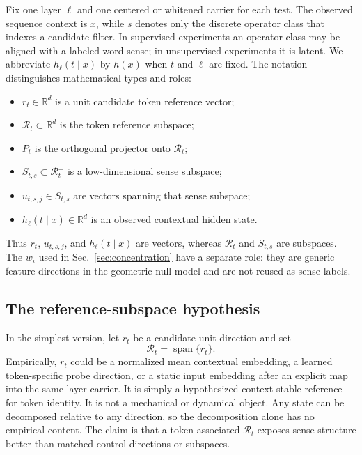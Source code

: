 \documentclass[
  aps,
  reprint,
  superscriptaddress,
  floatfix,
  nofootinbib,
  longbibliography
]{revtex4-2}
\newcommand{\R}{\mathbb{R}}
\DeclareMathOperator{\spanop}{span}
\begin{document}
Fix one layer $\ell$ and one centered or whitened carrier for each test.  The
observed sequence context is $x$, while $s$ denotes only the discrete operator
class that indexes a candidate filter.  In supervised experiments an operator
class may be aligned with a labeled word sense; in unsupervised experiments it
is latent.  We abbreviate $h_\ell(t\mid x)$ by $h(x)$ when $t$ and $\ell$ are
fixed.  The notation distinguishes mathematical types and roles:
%
\begin{itemize}
\item $r_t\in\R^d$ is a unit candidate token reference vector;
\item $\mathcal R_t\subset\R^d$ is the token reference subspace;
\item $P_t$ is the orthogonal projector onto $\mathcal R_t$;
\item $S_{t,s}\subset\mathcal R_t^\perp$ is a low-dimensional sense
subspace;
\item $u_{t,s,j}\in S_{t,s}$ are vectors spanning that sense subspace;
\item $h_\ell(t\mid x)\in\R^d$ is an observed contextual hidden state.
\end{itemize}
%
Thus $r_t$, $u_{t,s,j}$, and $h_\ell(t\mid x)$ are vectors, whereas
$\mathcal R_t$ and $S_{t,s}$ are subspaces. The $w_i$ used in
Sec.~\ref{sec:concentration} have a separate role: they are generic feature
directions in the geometric null model and are not reused as sense labels.

\subsection{The reference-subspace hypothesis}
\label{sec:reference-hypothesis}

In the simplest version, let $r_t$ be a candidate unit direction and set
%
\begin{equation}
\label{eq:reference-direction}
\mathcal R_t=\spanop\{r_t\}.
\end{equation}
%
Empirically, $r_t$ could be a normalized mean contextual embedding, a learned
token-specific probe direction, or a static input embedding after an explicit
map into the same layer carrier. It is simply a hypothesized context-stable reference for token
identity. It is not a mechanical or dynamical object.
Any state can be decomposed relative to any direction, so the decomposition
alone has no empirical content. The claim is that a token-associated
$\mathcal R_t$ exposes sense structure better than matched control
directions or subspaces.
\end{document}
